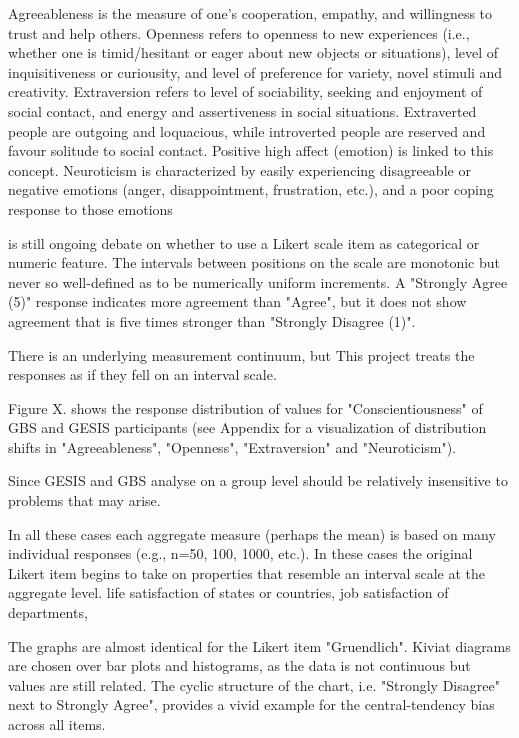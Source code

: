 Agreeableness is the measure of one's cooperation, empathy, and willingness to trust and help others. Openness refers to openness to new experiences (i.e., whether one is timid/hesitant or eager about new objects or situations), level of inquisitiveness or curiousity, and level of preference for variety, novel stimuli and creativity. Extraversion refers to level of sociability, seeking and enjoyment of social contact, and energy and assertiveness in social situations. Extraverted people are outgoing and loquacious, while introverted people are reserved and favour solitude to social contact. Positive high affect (emotion) is linked to this concept. Neuroticism is characterized by easily experiencing disagreeable or negative emotions (anger, disappointment, frustration, etc.), and a poor coping response to those emotions



 is still ongoing debate on whether to use a Likert scale item as categorical or numeric feature. The intervals between positions on the scale are monotonic but never so well-defined as to be numerically uniform increments. A "Strongly Agree (5)" response indicates more agreement than "Agree", but it does not show agreement that is five times stronger than "Strongly Disagree (1)". 

There is an underlying measurement continuum, but  
This project treats the responses as if they fell on an interval scale.

Figure X. shows the response distribution of values for "Conscientiousness" of GBS and GESIS participants (see Appendix for a visualization of distribution shifts in "Agreeableness", "Openness", "Extraversion" and "Neuroticism").

Since GESIS and GBS analyse  on a group level should be relatively insensitive to problems that may arise.

In all these cases each aggregate measure (perhaps the mean) is based on many individual responses (e.g., n=50, 100, 1000, etc.). In these cases the original Likert item begins to take on properties that resemble an interval scale at the aggregate level.
life satisfaction of states or countries,
job satisfaction of departments,

The graphs are almost identical for the Likert item "Gruendlich". Kiviat diagrams are chosen over bar plots and histograms, as the data is not continuous but values are still related. The cyclic structure of the chart, i.e. "Strongly Disagree" next to Strongly Agree", provides a vivid example for the central-tendency bias across all items.

